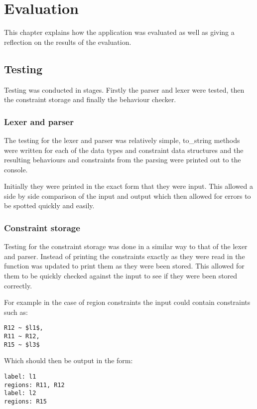 \chapter{Evaluation} \label{chaptest}

This chapter explains how the application was evaluated as well as giving a reflection on the results of the evaluation.

\section{Testing}

Testing was conducted in stages. Firstly the parser and lexer were tested, then the constraint storage and finally the behaviour checker.

\subsection{Lexer and parser}

The testing for the lexer and parser was relatively simple, to_string methods were written for each of the data types and constraint data structures and the resulting behaviours and constraints from the parsing were printed out to the console. 

Initially they were printed in the exact form that they were input. This allowed a side by side comparison of the input and output which then allowed for errors to be spotted quickly and easily. 

\subsection{Constraint storage}

Testing for the constraint storage was done in a similar way to that of the lexer and parser. Instead of printing the constraints exactly as they were read in the function was updated to print them as they were been stored. This allowed for them to be quickly checked against the input to see if they were been stored correctly. 

For example in the case of region constraints the input could contain constraints such as: 

\begin{lstlisting}
R12 ~ $l1$, 
R11 ~ R12,
R15 ~ $l3$
\end{lstlisting}

Which should then be output in the form: 

\begin{lstlisting}
label: l1
regions: R11, R12
label: l2
regions: R15
\end{lstlisting}

